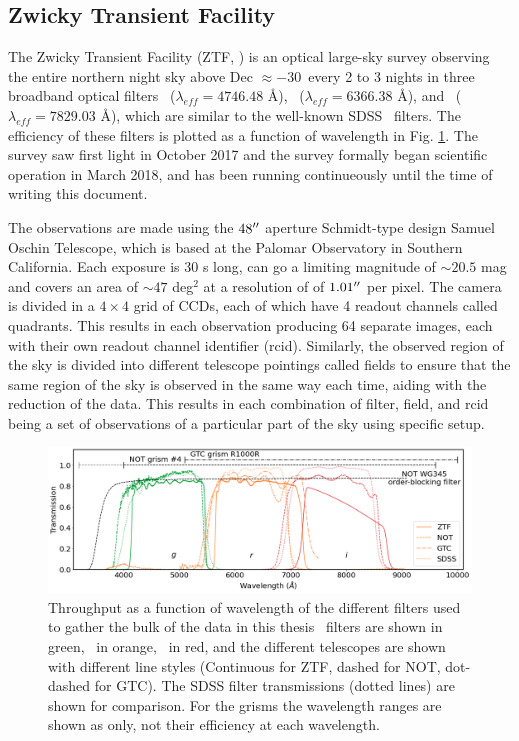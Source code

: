 \documentclass[a4paper,oneside,12pt, class=Latex/Classes/PhDthesisPSnPDF, crop=false]{standalone}
\begin{document}
\subsection{Zwicky Transient Facility}
\label{ZTF}
The Zwicky Transient Facility (ZTF, \citealt{ZTF_Surveys_Scheduler, ZTF_overview_and_1st_results, ZTF_Science_Objectives, ZTF_Instrumentation, ZTF_Observing_System}) is an optical large-sky survey observing the entire northern night sky above Dec $\approx -30$\degree\ every 2 to 3 nights in three broadband optical filters \ztfg~($\lambda_{eff} = 4746.48$ \AA), \ztfr~($\lambda_{eff} = 6366.38$ \AA), and \ztfi~($\lambda_{eff} = 7829.03$ \AA), which are similar to the well-known SDSS \ztfg\ztfr\ztfi\ filters. The efficiency of these filters is plotted as a function of wavelength in Fig. \ref{Optical_elements_plot}. The survey saw first light in October 2017 and the survey formally began scientific operation in March 2018, and has been running continueously until the time of writing this document.

The observations are made using the $48^{\prime\prime}$ aperture Schmidt-type design Samuel Oschin Telescope, which is based at the Palomar Observatory in Southern California. Each exposure is 30 s long, can go a limiting magnitude of $\sim20.5$ mag and covers an area of $\sim47$ deg$^2$ at a resolution of of $1.01^{\prime\prime}$ per pixel. The camera is divided in a $4\times4$ grid of CCDs, each of which have 4 readout channels called quadrants. This results in each observation producing 64 separate images, each with their own readout channel identifier (rcid). Similarly, the observed region of the sky is divided into different telescope pointings called fields to ensure that the same region of the sky is observed in the same way each time, aiding with the reduction of the data. This results in each combination of filter, field, and rcid being a set of observations of a particular part of the sky using specific setup.

\begin{figure}
    \centering
    \includegraphics[width=\textwidth]{../Images/chapter_2/transmissions.png}
    \caption{Throughput as a function of wavelength of the different filters used to gather the bulk of the data in this thesis \ztfg\ filters are shown in green, \ztfr\ in orange, \ztfi\ in red, and the different telescopes are shown with different line styles (Continuous for ZTF, dashed for NOT, dot-dashed for GTC). The SDSS filter transmissions (dotted lines) are shown for comparison. For the grisms the wavelength ranges are shown as only, not their efficiency at each wavelength.}
    \label{Optical_elements_plot}
\end{figure}
\end{document}
